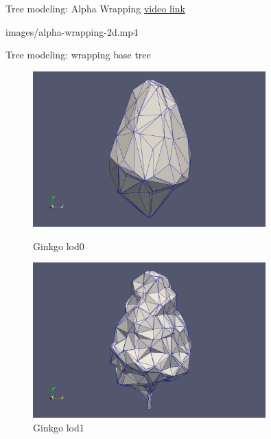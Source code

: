 \documentclass[10pt]{beamer}
\begin{document}
\begin{frame}{Tree modeling: Alpha Wrapping}
  \Large
  \href{https://youtu.be/xIIDolWCrgU}{video link}
  \begin{center}
    \movie[width=1\textwidth,height=0.8\textheight,poster,showcontrols]{}
    {images/alpha-wrapping-2d.mp4}
  \end{center}
\end{frame}

\begin{frame}{Tree modeling: wrapping base tree}
  \Large
  \begin{figure}[H]
    \centering
    \begin{minipage}{0.49\textwidth}
        \centering
        \includegraphics[width=0.8\textwidth]{images/gingko_lod0.png}
        \caption{Ginkgo lod0}
    \end{minipage}\hfill
    \begin{minipage}{0.49\textwidth}
        \centering
        \includegraphics[width=0.8\textwidth]{images/gingko_lod1.png}
        \caption{Ginkgo lod1}
    \end{minipage}
\end{figure}


\end{frame}
\end{document}
